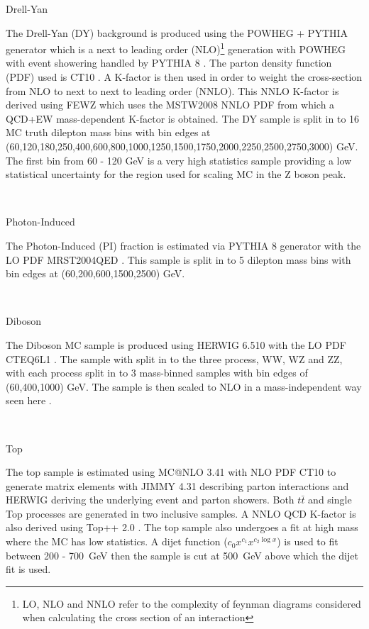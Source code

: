    {\bf\raggedright Drell-Yan}

   {\raggedright The Drell-Yan (DY) background is produced using the POWHEG + PYTHIA generator which is a next to leading order (NLO)\footnote{LO, NLO and NNLO refer to the complexity of feynman diagrams considered when calculating the cross section of an interaction} generation with POWHEG \cite{} with event showering handled by PYTHIA 8 \cite{}. The parton density function (PDF) used is CT10 \cite{}. A K-factor is then used in order to weight the cross-section from NLO to next to next to leading order (NNLO). This NNLO K-factor is derived using FEWZ \cite{} which uses the MSTW2008 NNLO PDF \cite{} from which a QCD+EW mass-dependent K-factor is obtained. The DY sample is split in to 16 MC truth dilepton mass bins with bin edges at (60,120,180,250,400,600,800,1000,1250,1500,1750,2000,2250,2500,2750,3000) GeV. The first bin from 60 - 120 GeV is a very high statistics sample providing a low statistical uncertainty for the region used for scaling MC in the Z boson peak.} \\


   {\bf\raggedright Photon-Induced}

   {\raggedright The Photon-Induced (PI) fraction is estimated via PYTHIA 8 \cite{} generator with the LO PDF MRST2004QED \cite{}. This sample is split in to 5 dilepton mass bins with bin edges at (60,200,600,1500,2500) GeV.}\\


   {\bf\raggedright Diboson}

   {\raggedright The Diboson MC sample is produced using HERWIG 6.510 \cite{} with the LO PDF CTEQ6L1 \cite{}. The sample with split in to the three process, WW, WZ and ZZ, with each process split in to 3 mass-binned samples with bin edges of (60,400,1000) GeV. The sample is then scaled to NLO in a mass-independent way seen here \cite{}.}\\

   {\bf\raggedright Top}

   {\raggedright The top sample is estimated using MC@NLO 3.41 \cite{} with NLO PDF CT10 \cite{} to generate matrix elements with JIMMY 4.31 \cite{} describing parton interactions and HERWIG \cite{} deriving the underlying event and parton showers. Both $t\bar{t}$ and single Top processes are generated in two inclusive samples. A NNLO QCD K-factor is also derived using Top++ 2.0 \cite{}. The top sample also undergoes a fit at high mass where the MC has low statistics. A dijet function ($c_{0}x^{c_{1}} x^{c_{2}\log{x}}$) is used to fit between 200 - 700~GeV then the sample is cut at 500~GeV above which the dijet fit is used.}


